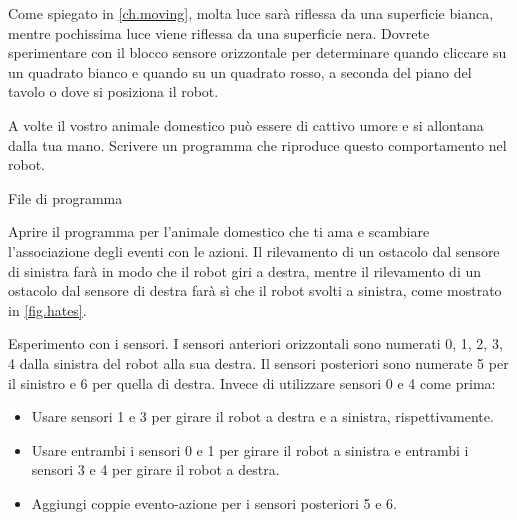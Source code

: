 Come spiegato in \cref{ch.moving}, molta luce sarà riflessa
da una superficie bianca, mentre pochissima luce viene riflessa da una
superficie nera.
Dovrete sperimentare con il blocco sensore orizzontale per determinare quando cliccare su un quadrato bianco e quando su un quadrato rosso, a seconda del piano del tavolo o dove si posiziona il robot.





A volte il vostro animale domestico può essere di cattivo umore e si allontana dalla tua mano.
Scrivere un programma che riproduce questo comportamento nel robot.

{\raggedleft \hfill File di programma }

Aprire il programma per l'animale domestico che ti ama e scambiare l'associazione
degli eventi con le azioni. Il rilevamento di un ostacolo dal sensore di sinistra
farà in modo che il robot giri a destra, mentre il rilevamento di un ostacolo dal sensore di destra farà sì che il robot svolti a sinistra, come mostrato in \cref{fig.hates}.


{
Esperimento con i sensori.
I sensori anteriori orizzontali sono numerati 0, 1, 2, 3, 4 dalla sinistra del robot alla sua destra.
Il sensori posteriori sono numerate 5 per il sinistro e 6 per quella di destra.
Invece di utilizzare sensori 0 e 4 come prima:
\begin{itemize}[noitemsep,nosep,leftmargin=*]
\item Usare sensori 1 e 3 per girare il robot a destra e a sinistra,
rispettivamente.
\item Usare entrambi i sensori 0 e 1 per girare il robot a sinistra e entrambi i sensori 3
e 4 per girare il robot a destra.
\item Aggiungi coppie evento-azione per i sensori posteriori 5 e 6.
\end{itemize}
}


